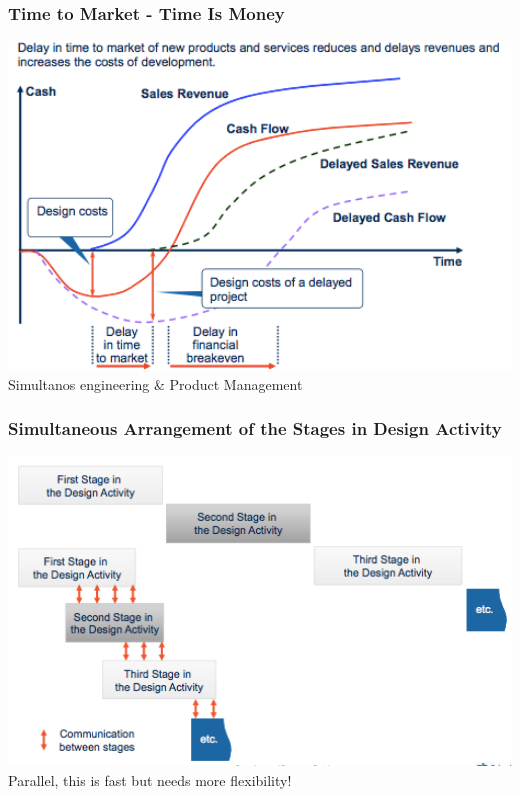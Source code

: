 \subsubsection{Time to Market - Time Is Money}
\includegraphics[width=1\textwidth]{W03/ttm}
Simultanos engineering \& Product Management
\subsubsection{Simultaneous Arrangement of the Stages in Design Activity}
\includegraphics[width=1\textwidth]{W03/designactivity}
Parallel, this is fast but needs more flexibility!
